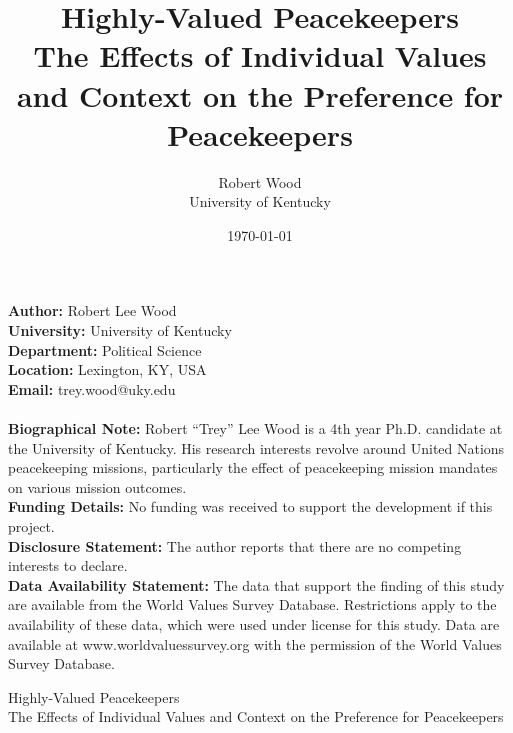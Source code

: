 \documentclass[12pt]{article}
\title{Highly-Valued Peacekeepers \\
\large The Effects of Individual Values and Context on the Preference for Peacekeepers}
\author{Robert Wood \\
University of Kentucky}
\date{\today}
\begin{document}

\begin{titlingpage}
\maketitle

\noindent \textbf{Author:} Robert Lee Wood \\
\textbf{University:} University of Kentucky \\
\textbf{Department:} Political Science \\
\textbf{Location:} Lexington, KY, USA \\
\textbf{Email:} trey.wood@uky.edu \\
\\
\textbf{Biographical Note:} Robert ``Trey'' Lee Wood is a 4th year Ph.D. candidate at the University of Kentucky. His research interests revolve around United Nations peacekeeping missions, particularly the effect of peacekeeping mission mandates on various mission outcomes. \\
\textbf{Funding Details:} No funding was received to support the development if this project. \\
\textbf{Disclosure Statement:} The author reports that there are no competing interests to declare. \\
\textbf{Data Availability Statement:} The data that support the finding of this study are available from the World Values Survey Database. Restrictions apply to the availability of these data, which were used under license for this study. Data are available at www.worldvaluessurvey.org with the permission of the World Values Survey Database. 

\end{titlingpage}

\clearpage


\begin{center}
{\LARGE Highly-Valued Peacekeepers} \\
The Effects of Individual Values and Context on the Preference for Peacekeepers
\end{center}
\end{document}
